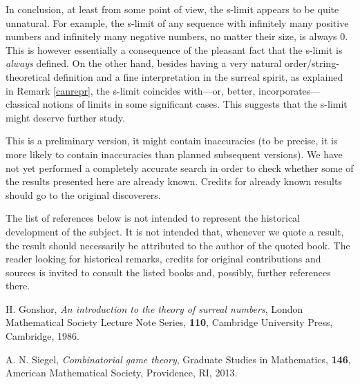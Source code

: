 \documentclass[12pt]{amsart}
\theoremstyle{definition}
\theoremstyle{remark}
\begin{document}
 
\smallskip

In conclusion, at least from some point of view,
 the s-limit appears to be quite unnatural.
For example, the s-limit of any sequence with infinitely many positive numbers
and infinitely many negative numbers, no matter their size,
 is always $0$.
This is however essentially a consequence of the pleasant fact that the 
s-limit
is \emph{always} defined.
On the other hand, besides having a very natural order/string-theoretical
definition and a fine interpretation in the surreal spirit,
as explained in Remark \ref{canrepr}, 
 the s-limit coincides with---or, better, incorporates---
classical notions of limits in some  significant cases.
This suggests that the s-limit might deserve further study.

\smallskip 

This is a preliminary version, it might contain
inaccuracies (to be precise, it is more likely to contain
inaccuracies than planned subsequent versions).
We have not yet performed a completely accurate 
search in order to 
check whether some of the results presented here are 
already known. Credits for already known results
should go to the original discoverers. 

\smallskip 

The list of references below is not intended to represent
the historical development of the subject.
It is not intended that, whenever we quote a result, 
the result should necessarily be attributed to the author of the 
quoted book.
The reader looking for historical remarks, credits
 for original contributions
and sources is
invited to consult the listed books and, possibly,
further  references 
there.

\begin{thebibliography}{1}

 H. Gonshor, 
   \emph{An introduction to the theory of surreal numbers},
   London Mathematical Society Lecture Note Series, \textbf{110}, Cambridge
   University Press, Cambridge, 1986. 

A. N. Siegel, \emph{Combinatorial game theory}, Graduate
   Studies in Mathematics, \textbf{146}, American Mathematical Society, Providence,
   RI, 2013.

\end{thebibliography} 
\end{document}
